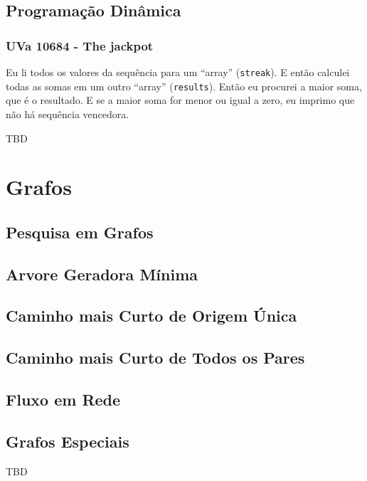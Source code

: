 \documentclass[11pt]{scrartcl}
\newcommand{\code}[1]{\texttt{\colorbox{bg_code_color}{#1}}}
\begin{document}
\subsection{Programação Dinâmica}
\subsubsection{UVa 10684 - The jackpot}
Eu li todos os valores da sequência para um ``array'' (\code{streak}). E então calculei todas as somas em um outro ``array'' (\code{results}). Então eu procurei a maior soma, que é o resultado. E se a maior soma for menor ou igual a zero, eu imprimo que não há sequência vencedora.


TBD


\section{Grafos}

\subsection{Pesquisa em Grafos}

\subsection{Arvore Geradora Mínima}

\subsection{Caminho mais Curto de Origem Única}

\subsection{Caminho mais Curto de Todos os Pares}

\subsection{Fluxo em Rede}

\subsection{Grafos Especiais}

TBD


\end{document}
